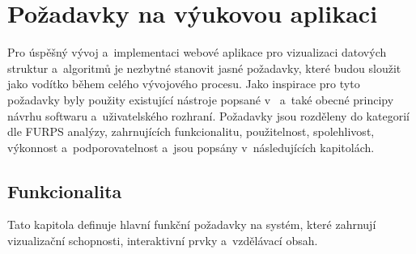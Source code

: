 \chapter{Požadavky na výukovou aplikaci}
\label{chap:requirements}

Pro úspěšný vývoj a~implementaci webové aplikace pro vizualizaci datových struktur a~algoritmů je nezbytné stanovit jasné požadavky, které budou sloužit jako vodítko během celého vývojového procesu.
Jako inspirace pro tyto požadavky byly použity existující nástroje popsané v~ a~také obecné principy návrhu softwaru a~uživatelského rozhraní.
Požadavky jsou rozděleny do kategorií dle FURPS analýzy, zahrnujících funkcionalitu, použitelnost, spolehlivost, výkonnost a~podporovatelnost a~jsou popsány v~následujících kapitolách.

\section{Funkcionalita}
\label{sec:functionality}

Tato kapitola definuje hlavní funkční požadavky na systém, které zahrnují vizualizační schopnosti, interaktivní prvky a~vzdělávací obsah.

